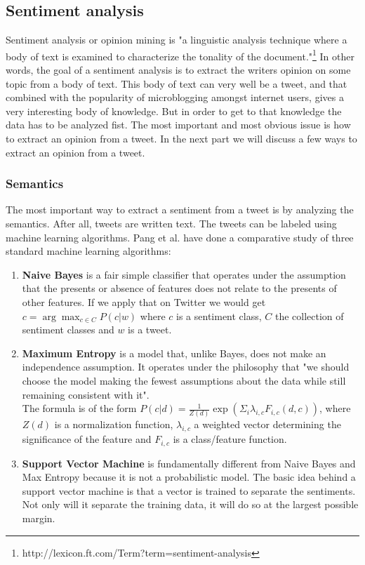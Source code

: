 \documentclass{article}
\begin{document}
\subsection{Sentiment analysis}
Sentiment analysis or opinion mining is "a linguistic analysis technique where a body of text is examined to characterize the tonality of the document."\footnote{http://lexicon.ft.com/Term?term=sentiment-analysis} In other words, the goal of a sentiment analysis is to extract the writers opinion on some topic from a body of text. This body of text can very well be a tweet, and that combined with the popularity of microblogging amongst internet users, gives a very interesting body of knowledge. But in order to get to that knowledge the data has to be analyzed fist. 
The most important and most obvious issue is how to extract an opinion from a tweet. In the next part we will discuss a few ways to extract an opinion from a tweet.
\subsubsection{Semantics }
The most important way to extract a sentiment from a tweet is by analyzing the semantics. After all, tweets are written text. The tweets can be labeled using machine learning algorithms. Pang et al. \cite{machineLearning} have done a comparative study of three standard machine learning algorithms: 
\begin{enumerate}
\item \textbf{Naive Bayes} is a fair simple classifier that operates under the assumption that the presents or absence of features does not relate to the presents of other features. If we apply that on Twitter we would get $c = \arg\max_{c\in C} P(c|w)$ where $c$ is a sentiment class, $C$ the collection of sentiment classes and $w$ is a tweet. \cite{sentAnalysis}
\item \textbf{Maximum Entropy} is a model that, unlike Bayes, does not make an independence assumption. It operates under the philosophy that "we should choose the model making the fewest assumptions about the data while still remaining consistent with it".\cite{machineLearning} \\
The formula is of the form $P(c|d) = \frac{1}{Z(d)}\exp(\Sigma_i \lambda_{i,c}F_{i,c}(d,c))$, where $Z(d)$ is a normalization function, $\lambda_{i,c}$ a weighted vector determining the significance of the feature and $F_{i,c}$ is a class/feature function. 
\item \textbf{Support Vector Machine} is fundamentally different from Naive Bayes and Max Entropy because it is not a probabilistic model. The basic idea behind a support vector machine is that a vector is trained to separate the sentiments. Not only will it separate the training data, it will do so at the largest possible margin. 
\end{enumerate}
\end{document}
